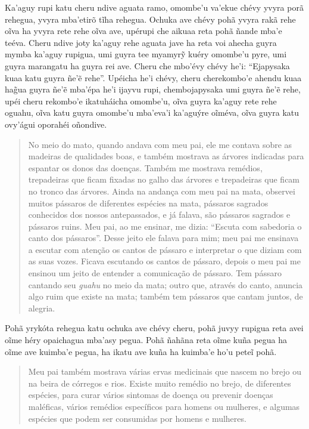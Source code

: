 \begin{itemize}
Ka'aguy rupi katu cheru ndive aguata ramo, omombe'u va'ekue chévy yvyra
porã rehegua, yvyra mba'etirõ tĩha rehegua. Ochuka ave chévy pohã yvyra
rakã rehe oĩva ha yvyra rete rehe oĩva ave, upérupi che aikuaa reta pohã
ñande mba'e teéva. Cheru ndive joty ka'aguy rehe aguata jave ha reta voi
ahecha guyra mymba ka'aguy rupigua, umi guyra tee myamyrỹ kuéry omombe'u
pyre, umi guyra marangatu ha guyra rei ave. Cheru che mbo'évy chévy
he'i: ``Ejapysaka kuaa katu guyra ñe'ẽ rehe''. Upéicha he'i chévy, cheru
cherekombo'e ahendu kuaa hag̃ua guyra ñe'ẽ mba'épa he'i ijayvu rupi,
chembojapysaka umi guyra ñe'ẽ rehe, upéi cheru rekombo'e ikatuháicha
omombe'u, oĩva guyra ka'aguy rete rehe oguahu, oĩva katu guyra omombe'u
mba'eva'i ka'aguýre oĩméva, oĩva guyra katu ovy'águi oporahéi oñondive.

\begin{quote}
No meio do mato, quando andava com meu pai, ele me contava sobre as
madeiras de qualidades boas, e também mostrava as árvores indicadas para
espantar os donos das doenças. Também me mostrava remédios, trepadeiras
que ficam fixadas no galho das árvores e trepadeiras que ficam no tronco
das árvores. Ainda na andança com meu pai na mata, observei muitos
pássaros de diferentes espécies na mata, pássaros sagrados conhecidos
dos nossos antepassados, e já falava, são pássaros sagrados e pássaros
ruins. Meu pai, ao me ensinar, me dizia: ``Escuta com sabedoria o canto
dos pássaros''. Desse jeito ele falava para mim; meu pai me ensinava a
escutar com atenção os cantos de pássaro e interpretar o que diziam com
as suas vozes. Ficava escutando os cantos de pássaro, depois o meu pai
me ensinou um jeito de entender a comunicação de pássaro. Tem pássaro
cantando seu \emph{guahu} no meio da mata; outro que, através do canto,
anuncia algo ruim que existe na mata; também tem pássaros que cantam
juntos, de alegria.
\end{quote}

Pohã yrykóta rehegua katu ochuka ave chévy cheru, pohã juvyy rupigua
reta avei oĩme héry opaichagua mba'asy pegua. Pohã ñahãna reta oĩme kuña
pegua ha oĩme ave kuimba'e pegua, ha ikatu ave kuña ha kuimba'e ho'u
peteĩ pohã.

\begin{quote}
Meu pai também mostrava várias ervas medicinais que nascem no brejo ou
na beira de córregos e rios. Existe muito remédio no brejo, de
diferentes espécies, para curar vários sintomas de doença ou prevenir
doenças maléficas, vários remédios específicos para homens ou mulheres,
e algumas espécies que podem ser consumidas por homens e mulheres.
\end{quote}


\end{itemize}
